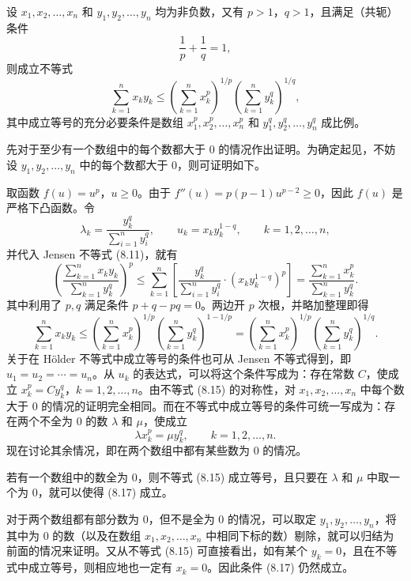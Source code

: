 \begin{xtheorem}
设 $x_1,x_2,\ldots,x_n$ 和 $y_1,y_2,\ldots,y_n$ 均为非负数，又有 $p>1$，$q>1$，且满足（共轭）条件
\[
  \frac1p+\frac1q=1,
\]
则成立不等式
\begin{equation}
  \sum_{k=1}^n x_ky_k
  \le\left(\sum_{k=1}^n x_k^p\right)^{1/p}
  \left(\sum_{k=1}^n y_k^q\right)^{1/q},
  \tag{8.15}
  \label{eq:8.15}
\end{equation}
其中成立等号的充分必要条件是数组 $x_1^p,x_2^p,\ldots,x_n^p$ 和 $y_1^q,y_2^q,\ldots,y_n^q$ 成比例。
\end{xtheorem}
\begin{xproof}
先对于至少有一个数组中的每个数都大于 0 的情况作出证明。为确定起见，不妨设 $y_1,y_2,\ldots,y_n$ 中的每个数都大于 0，则可证明如下。

取函数 $f(u)=u^p$，$u\ge0$。由于 $f''(u)=p(p-1)u^{p-2}\ge0$，因此 $f(u)$ 是严格下凸函数。令
\[
  \lambda_k=\frac{y_k^q}{\sum_{i=1}^n y_i^q},
  \qquad
  u_k=x_ky_k^{1-q},
  \qquad k=1,2,\ldots,n,
\]
并代入 Jensen 不等式 (8.11)，就有
\begin{equation}
  \left(\frac{\sum_{k=1}^n x_ky_k}{\sum_{k=1}^n y_k^q}\right)^p
  \le\sum_{k=1}^n\left[
    \frac{y_k^q}{\sum_{i=1}^n y_i^q}\cdot(x_ky_k^{1-q})^p
  \right]
  =\frac{\sum_{k=1}^n x_k^p}{\sum_{k=1}^n y_k^q}.
  \tag{8.16}
  \label{eq:8.16}
\end{equation}
其中利用了 $p,q$ 满足条件 $p+q-pq=0$。两边开 $p$ 次根，并略加整理即得
\[
  \sum_{k=1}^n x_ky_k
  \le\left(\sum_{k=1}^n x_k^p\right)^{1/p}
  \left(\sum_{k=1}^n y_k^q\right)^{1-1/p}
  =\left(\sum_{k=1}^n x_k^p\right)^{1/p}
  \left(\sum_{k=1}^n y_k^q\right)^{1/q}.
\]
关于在 Hölder 不等式中成立等号的条件也可从 Jensen 不等式得到，即 $u_1=u_2=\cdots=u_n$。从 $u_k$ 的表达式，可以将这个条件写成为：存在常数 $C$，使成立 $x_k^p=Cy_k^q$，$k=1,2,\ldots,n$。由不等式 (8.15) 的对称性，对 $x_1,x_2,\ldots,x_n$ 中每个数大于 0 的情况的证明完全相同。而在不等式中成立等号的条件可统一写成为：存在两个不全为 0 的数 $\lambda$ 和 $\mu$，使成立
\begin{equation}
  \lambda x_k^p=\mu y_k^q,\qquad k=1,2,\ldots,n.
  \tag{8.17}
  \label{eq:8.17}
\end{equation}
现在讨论其余情况，即在两个数组中都有某些数为 0 的情况。

若有一个数组中的数全为 0，则不等式 (8.15) 成立等号，且只要在 $\lambda$ 和 $\mu$ 中取一个为 0，就可以使得 (8.17) 成立。

对于两个数组都有部分数为 0，但不是全为 0 的情况，可以取定 $y_1,y_2,\ldots,y_n$，将其中为 0 的数（以及在数组 $x_1,x_2,\ldots,x_n$ 中相同下标的数）剔除，就可以归结为前面的情况来证明。又从不等式 (8.15) 可直接看出，如有某个 $y_k=0$，且在不等式中成立等号，则相应地也一定有 $x_k=0$。因此条件 (8.17) 仍然成立。
\end{xproof}

